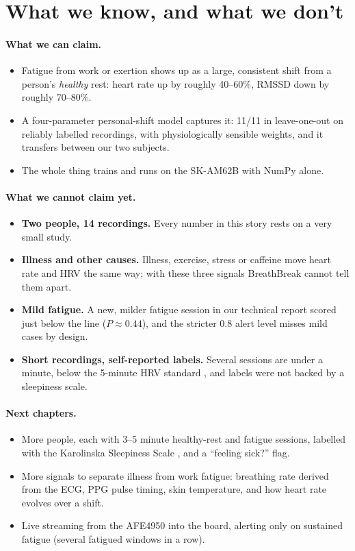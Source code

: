 \documentclass[11pt]{article}
\begin{document}
\section{What we know, and what we don't}

\paragraph{What we can claim.}
\begin{itemize}
  \item Fatigue from work or exertion shows up as a large, consistent shift from a person's \emph{healthy}
  rest: heart rate up by roughly 40--60\%, RMSSD down by roughly 70--80\%.
  \item A four-parameter personal-shift model captures it: 11/11 in leave-one-out on reliably labelled
  recordings, with physiologically sensible weights, and it transfers between our two subjects.
  \item The whole thing trains and runs on the SK-AM62B with NumPy alone.
\end{itemize}

\paragraph{What we cannot claim yet.}
\begin{itemize}
  \item \textbf{Two people, 14 recordings.} Every number in this story rests on a very small study.
  \item \textbf{Illness and other causes.} Illness, exercise, stress or caffeine move heart rate and HRV the
  same way; with these three signals BreathBreak cannot tell them apart.
  \item \textbf{Mild fatigue.} A new, milder fatigue session in our technical report scored just below the
  line ($P\approx0.44$), and the stricter 0.8 alert level misses mild cases by design.
  \item \textbf{Short recordings, self-reported labels.} Several sessions are under a minute, below the
  5-minute HRV standard \cite{taskforce1996}, and labels were not backed by a sleepiness scale.
\end{itemize}

\paragraph{Next chapters.}
\begin{itemize}
  \item More people, each with 3--5 minute healthy-rest and fatigue sessions, labelled with the Karolinska
  Sleepiness Scale \cite{kss1990}, and a ``feeling sick?'' flag.
  \item More signals to separate illness from work fatigue: breathing rate derived from the ECG, PPG pulse
  timing, skin temperature, and how heart rate evolves over a shift.
  \item Live streaming from the AFE4950 into the board, alerting only on sustained fatigue (several
  fatigued windows in a row).
\end{itemize}
\end{document}
